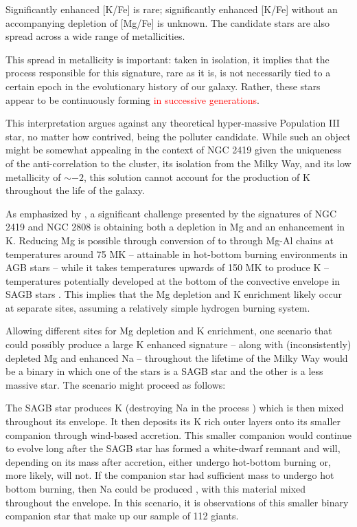 \documentclass[a4paper,fleqn,usenatbib]{mnras}
\newcommand{\todo}[1]{\textcolor{red}{#1}}
\begin{document}
Significantly enhanced [K/Fe] is rare; significantly enhanced [K/Fe] without an accompanying depletion of [Mg/Fe] is unknown. The candidate stars are also spread across a wide range of metallicities.

This spread in metallicity is important: taken in isolation, it implies that the process responsible for this signature, rare as it is, is not necessarily tied to a certain epoch in the evolutionary history of our galaxy. Rather, these stars appear to be continuously forming \todo{ in successive generations}.

This interpretation argues against any theoretical hyper-massive Population III star, no matter how contrived, being the polluter candidate. While such an object might be somewhat appealing in the context of NGC 2419 given the uniqueness of the anti-correlation to the cluster, its isolation from the Milky Way, and its low metallicity of $\sim -2$, this solution cannot account for the production of K throughout the life of the galaxy.

As emphasized by \cite{prantzos2017}, a significant challenge presented by the signatures of NGC 2419 and NGC 2808 is obtaining both a depletion in Mg and an enhancement in K. Reducing Mg is possible through conversion of  to  through Mg-Al chains at temperatures around 75 MK --  attainable in hot-bottom burning environments in AGB stars -- while it takes temperatures upwards of 150 MK to produce K -- temperatures potentially developed at the bottom of the convective envelope in SAGB stars \citep{iliadis2016}. This implies that the Mg depletion and K enrichment likely occur at separate sites, assuming a relatively simple hydrogen burning system.

Allowing different sites for Mg depletion and K enrichment, one scenario that could possibly produce a large K enhanced signature -- along with (inconsistently) depleted Mg and enhanced Na -- throughout the lifetime of the Milky Way would be a binary in which one of the stars is a SAGB star and the other is a less massive star. The scenario might proceed as follows:

The SAGB star produces K (destroying Na in the process \citep{prantzos2017}) which is then mixed throughout its envelope. It then deposits its K rich outer layers onto its smaller companion through wind-based accretion. This smaller companion would continue to evolve long after the SAGB star has formed a white-dwarf remnant and will, depending on its mass after accretion, either undergo hot-bottom burning or, more likely, will not. If the companion star had sufficient mass to undergo hot bottom burning, then Na could be produced \citep{prantzos2017}, with this material mixed throughout the envelope. In this scenario, it is observations of this smaller binary companion star that make up our sample of 112 giants.
\end{document}
